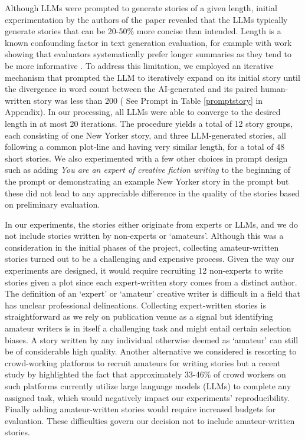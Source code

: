 Although LLMs were prompted to generate stories of a given length, initial experimentation by the authors of the paper revealed that the LLMs typically generate stories that can be 20-50\% more concise than intended. Length is a known confounding factor in text generation evaluation, for example with work showing that evaluators systematically prefer longer summaries as they tend to be more informative \cite{stiennon2020learning}. To address this limitation, we employed an iterative mechanism that prompted the LLM to iteratively expand on its initial story until the divergence in word count between the AI-generated and its paired human-written story was less than 200 ( See Prompt in Table \ref{promptstory} in Appendix). In our processing, all LLMs were able to converge to the desired length in at most 20 iterations. The procedure yields a total of 12 story groups, each consisting of one New Yorker story, and three LLM-generated stories, all following a common plot-line and having very similar length, for a total of 48 short stories.
We also experimented with a few other choices in prompt design such as adding \textit{You are an expert of creative fiction writing} to the beginning of the prompt or demonstrating an example New Yorker story in the prompt but these did not lead to any appreciable difference in the quality of the stories based on preliminary evaluation.

In our experiments, the stories either originate from experts or LLMs, and we do not include stories written by non-experts or `amateurs'. Although this was a consideration in the initial phases of the project, collecting amateur-written stories turned out to be a challenging and expensive process. Given the way our experiments are designed, it would require recruiting 12 non-experts to write stories given a plot since each expert-written story comes from a distinct author. The definition of an `expert' or `amateur' creative writer is difficult in a field that has unclear professional delineations. Collecting expert-written stories is straightforward as we rely on publication venue as a signal but identifying amateur writers is in itself a challenging task and might entail certain selection biases. A story written by any individual otherwise deemed as `amateur' can still be of considerable high quality. Another alternative we considered is resorting to crowd-working platforms to recruit amateurs for writing stories but a recent study by \citet{veselovsky2023artificial} highlighted the fact that approximately 33-46\% of crowd workers on such platforms currently utilize large language models (LLMs) to complete any assigned task, which would negatively impact our experiments' reproducibility. Finally adding amateur-written stories would require increased budgets for evaluation. These difficulties govern our decision not to include amateur-written stories.